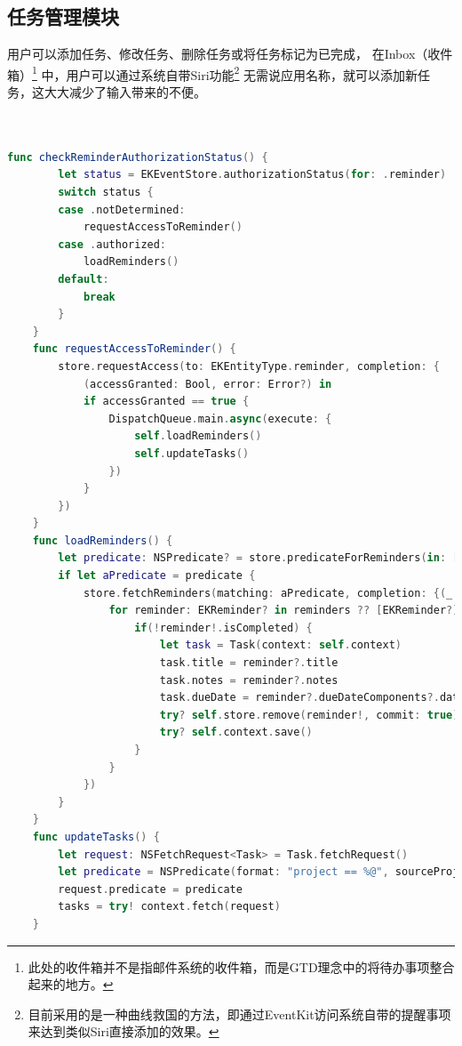 \subsection{任务管理模块}
用户可以添加任务、修改任务、删除任务或将任务标记为已完成，
在Inbox（收件箱）\footnote{此处的收件箱并不是指邮件系统的收件箱，而是GTD理念中的将待办事项整合起来的地方。}
中，用户可以通过系统自带Siri功能\footnote{目前采用的是一种曲线救国的方法，即通过EventKit访问系统自带的提醒事项来达到类似Siri直接添加的效果。}
无需说应用名称，就可以添加新任务，这大大减少了输入带来的不便。
~\\
~\\
~\\
\begin{lstlisting}[language={Swift}, caption={请求提醒事项权限并导入系统代码逻辑}]
	func checkReminderAuthorizationStatus() {
        let status = EKEventStore.authorizationStatus(for: .reminder)
        switch status {
        case .notDetermined:
            requestAccessToReminder()
        case .authorized:
            loadReminders()
        default:
            break
        }
    }
    func requestAccessToReminder() {
        store.requestAccess(to: EKEntityType.reminder, completion: {
            (accessGranted: Bool, error: Error?) in
            if accessGranted == true {
                DispatchQueue.main.async(execute: {
                    self.loadReminders()
                    self.updateTasks()
                })
            }
        })
    }
    func loadReminders() {
        let predicate: NSPredicate? = store.predicateForReminders(in: [store.defaultCalendarForNewReminders()!])
        if let aPredicate = predicate {
            store.fetchReminders(matching: aPredicate, completion: {(_ reminders: [EKReminder]?) -> Void in
                for reminder: EKReminder? in reminders ?? [EKReminder?]() {
                    if(!reminder!.isCompleted) {
                        let task = Task(context: self.context)
                        task.title = reminder?.title
                        task.notes = reminder?.notes
                        task.dueDate = reminder?.dueDateComponents?.date
                        try? self.store.remove(reminder!, commit: true)
                        try? self.context.save()
                    }
                }
            })
        }
    }
    func updateTasks() {
        let request: NSFetchRequest<Task> = Task.fetchRequest()
        let predicate = NSPredicate(format: "project == %@", sourceProject ?? 0)
        request.predicate = predicate
        tasks = try! context.fetch(request)
    }
\end{lstlisting}

